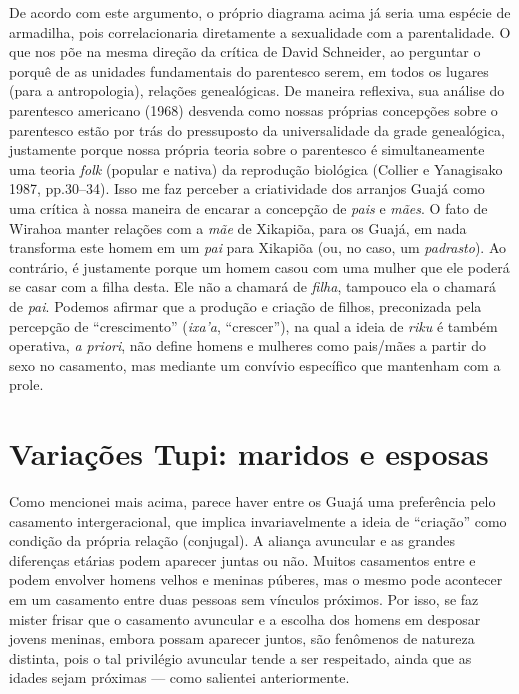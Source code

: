 De acordo com este argumento, o próprio diagrama acima já seria uma
espécie de armadilha, pois correlacionaria diretamente a sexualidade com
a parentalidade. O que nos põe na mesma direção da crítica de David
Schneider, ao perguntar o porquê de as unidades fundamentais do
parentesco serem, em todos os lugares (para a antropologia), relações
genealógicas. De maneira reflexiva, sua análise do parentesco americano
(1968) desvenda como nossas próprias concepções sobre o parentesco estão
por trás do pressuposto da universalidade da grade genealógica,
justamente porque nossa própria teoria sobre o parentesco é
simultaneamente uma teoria \emph{folk} (popular e nativa) da reprodução
biológica (Collier e Yanagisako 1987, pp.30--34). Isso me faz perceber a
criatividade dos arranjos Guajá como uma crítica à nossa maneira de
encarar a concepção de \emph{pais} e \emph{mães}. O fato de Wirahoa
manter relações com a \emph{mãe} de Xikapiõa, para os Guajá, em nada
transforma este homem em um \emph{pai} para Xikapiõa (ou, no caso, um
\emph{padrasto}). Ao contrário, é justamente porque um homem casou com
uma mulher que ele poderá se casar com a filha desta. Ele não a chamará
de \emph{filha}, tampouco ela o chamará de \emph{pai}. Podemos afirmar
que a produção e criação de filhos, preconizada pela percepção de
``crescimento'' (\emph{ixa'a}, ``crescer''), na qual a ideia de
\emph{riku} é também operativa, \emph{a priori}, não define homens e
mulheres como pais/mães a partir do sexo no casamento, mas mediante um
convívio específico que mantenham com a prole.

\section{Variações Tupi: maridos e esposas}\label{variauxe7uxf5es-tupi-maridos-e-esposas}

Como mencionei mais acima, parece haver entre os Guajá uma preferência
pelo casamento intergeracional, que implica invariavelmente a ideia de
``criação'' como condição da própria relação (conjugal). A aliança
avuncular e as grandes diferenças etárias podem aparecer juntas ou não.
Muitos casamentos entre  e  podem envolver homens velhos e meninas
púberes, mas o mesmo pode acontecer em um casamento entre duas pessoas
sem vínculos próximos. Por isso, se faz mister frisar que o casamento
avuncular e a escolha dos homens em desposar jovens meninas, embora
possam aparecer juntos, são fenômenos de natureza distinta, pois o tal
privilégio avuncular tende a ser respeitado, ainda que as idades sejam
próximas --- como salientei anteriormente.

